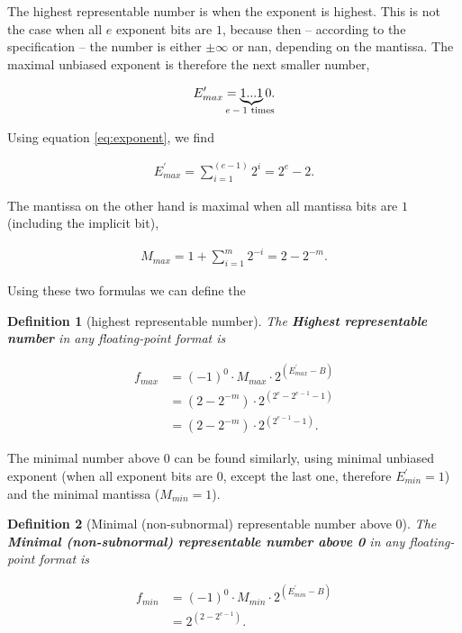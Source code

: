 \documentclass{article}
\theoremstyle{plain} %
\newtheorem{definition}{Definition}[section]
\theoremstyle{convention} %
\theoremstyle{remark} %
\def\df#1{\textbf{\textit{#1}}}
\numberwithin{equation}{section}
\begin{document}


The highest representable number is when the exponent is highest. This is not the case when all $e$ exponent bits are $1$, because then -- according to the specification \cite{ieee754_1985} -- the number is either $\pm \infty$ or \acrfull{nan}, depending on the mantissa. The maximal unbiased exponent is therefore the next smaller number,

\begin{align*}
    E^{\prime}_{max} = \underbrace{ 1...1 }_{\text{\makebox[0pt]{$e-1$ times} }}0.
\end{align*}

Using equation \eqref{eq:exponent}, we find

\begin{align*}
    E^{\prime}_{max} = \sum_{i=1}^{(e-1)} 2^i = 2^e -2.
\end{align*}

The mantissa on the other hand is maximal when all mantissa bits are $1$ (including the implicit bit),

\begin{align*}
    M_{max} = 1 + \sum_{i=1}^{m} 2^{-i} = 2 - 2^{-m}.
\end{align*}

Using these two formulas we can define the

\begin{definition}[highest representable number]

The \df{Highest representable number} in any floating-point format is

\begin{align*}
    f_{max} &= (-1)^0 \cdot M_{max} \cdot 2^{(E^{\prime}_{max} - B)} \\
            &= ( 2 - 2^{-m} ) \cdot 2^{(2^e -2^{e-1} -1)} \\
            &= ( 2 - 2^{-m} ) \cdot 2^{(2^{e-1} -1)}.
\end{align*}

\end{definition}

The minimal number above \num{0} can be found similarly, using minimal unbiased exponent (when all exponent bits are \num{0}, except the last one, therefore $E^{\prime}_{min} = 1$) and the minimal mantissa ($M_{min} = 1$).

\begin{definition}[Minimal (non-subnormal) representable number above \num{0}]

The \df{Minimal (non-subnormal) representable number above \num{0}} in any floating-point format is

\begin{align*}
    f_{min} &= (-1)^0 \cdot M_{min} \cdot 2^{(E^{\prime}_{min} - B)} \\
            &= 2^{(2 - 2^{e-1})}.
\end{align*}

\end{definition}
\end{document}
